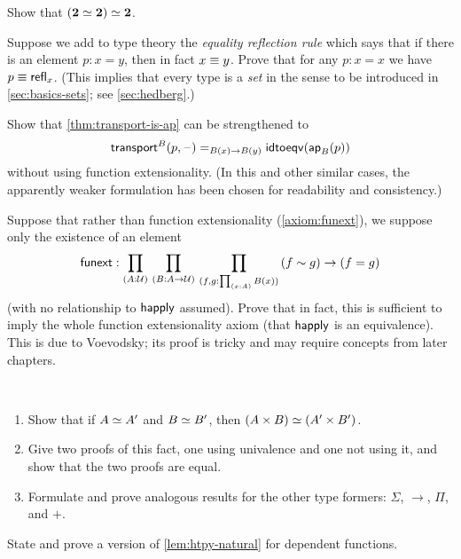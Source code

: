\documentclass[hott-all.tex]{subfiles}
\begin{document}
\begin{ex}\label{ex:eqvboolbool}
  Show that $(\mathbf{2} \simeq \mathbf{2}) \simeq \mathbf{2}$.
\end{ex}

\begin{ex}\label{ex:equality-reflection}
  Suppose we add to type theory the \emph{equality reflection rule} which says that if there is an element $p:x=y$, then in fact $x\equiv y$.
  Prove that for any $p:x=x$ we have $p\equiv \mathsf{refl}_{x}$.
  (This implies that every type is a \emph{set} in the sense to be introduced in \cref{sec:basics-sets}; see \cref{sec:hedberg}.)
\end{ex}

\begin{ex}\label{ex:strengthen-transport-is-ap}
  Show that \cref{thm:transport-is-ap} can be strengthened to
  \[\mathsf{transport}^{B}(p,{\mathord{\hspace{1pt}\text{--}\hspace{1pt}}}) =_{B(x)\to B(y)} \mathsf{idtoeqv}(\mathsf{ap}_{B}(p))\]
  without using function extensionality.
  (In this and other similar cases, the apparently weaker formulation has been chosen for readability and consistency.)
\end{ex}

\begin{ex}\label{ex:strong-from-weak-funext}
  Suppose that rather than function extensionality (\cref{axiom:funext}), we suppose only the existence of an element
  \[ \funext : \prd{A:\UU}{B:A\to \UU}{f,g:\prd{x:A} B(x)} (f\htpy g) \to (f=g) \]
  (with no relationship to $\mathsf{happly}$ assumed).
  Prove that in fact, this is sufficient to imply the whole function extensionality axiom (that $\mathsf{happly}$ is an equivalence).
  This is due to Voevodsky; its proof is tricky and may require concepts from later chapters.
\end{ex}

\begin{ex}\label{ex:equiv-functor-types}\
  \begin{enumerate}
  \item Show that if $A \simeq A'$  and $B \simeq B'$, then $(A\times B) \simeq (A'\times B')$.
  \item Give two proofs of this fact, one using univalence and one not using it, and show that the two proofs are equal.
  \item Formulate and prove analogous results for the other type formers: $\Sigma$, $\to$, $\Pi$, and $+$.
\end{enumerate}
\end{ex}

\begin{ex}\label{ex:dep-htpy-natural}
  State and prove a version of \cref{lem:htpy-natural} for dependent functions.
\end{ex}
\end{document}

